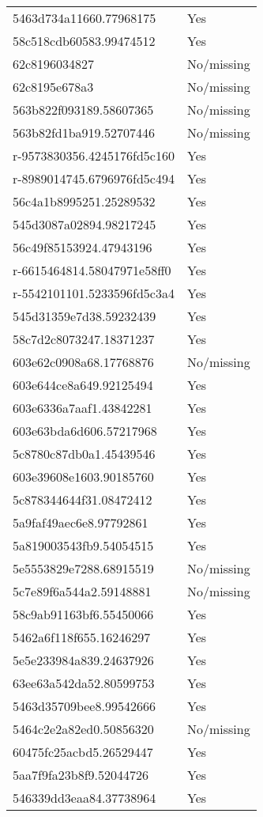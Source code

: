 \begin{tabular}{ll}
5463d734a11660.77968175 & Yes \\
58c518cdb60583.99474512 & Yes \\
62c8196034827 & No/missing \\
62c8195e678a3 & No/missing \\
563b822f093189.58607365 & No/missing \\
563b82fd1ba919.52707446 & No/missing \\
r-9573830356.4245176fd5c160 & Yes \\
r-8989014745.6796976fd5c494 & Yes \\
56c4a1b8995251.25289532 & Yes \\
545d3087a02894.98217245 & Yes \\
56c49f85153924.47943196 & Yes \\
r-6615464814.58047971e58ff0 & Yes \\
r-5542101101.5233596fd5c3a4 & Yes \\
545d31359e7d38.59232439 & Yes \\
58c7d2c8073247.18371237 & Yes \\
603e62c0908a68.17768876 & No/missing \\
603e644ce8a649.92125494 & Yes \\
603e6336a7aaf1.43842281 & Yes \\
603e63bda6d606.57217968 & Yes \\
5c8780c87db0a1.45439546 & Yes \\
603e39608e1603.90185760 & Yes \\
5c878344644f31.08472412 & Yes \\
5a9faf49aec6e8.97792861 & Yes \\
5a819003543fb9.54054515 & Yes \\
5e5553829e7288.68915519 & No/missing \\
5c7e89f6a544a2.59148881 & No/missing \\
58c9ab91163bf6.55450066 & Yes \\
5462a6f118f655.16246297 & Yes \\
5e5e233984a839.24637926 & Yes \\
63ee63a542da52.80599753 & Yes \\
5463d35709bee8.99542666 & Yes \\
5464c2e2a82ed0.50856320 & No/missing \\
60475fc25acbd5.26529447 & Yes \\
5aa7f9fa23b8f9.52044726 & Yes \\
546339dd3eaa84.37738964 & Yes \\

\end{tabular}
